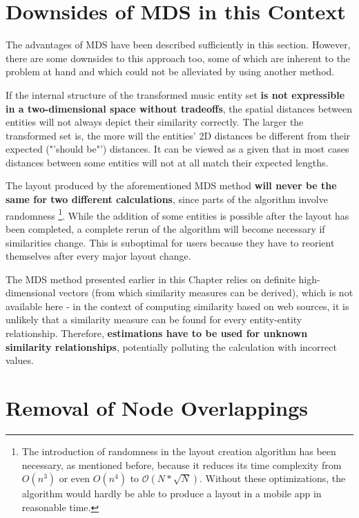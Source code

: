 \section{Downsides of MDS in this Context}

The advantages of MDS have been described sufficiently in this section. However, there are some downsides to this approach too, some of which are inherent to the problem at hand and which could not be alleviated by using another method.

If the internal structure of the transformed music entity set \textbf{is not expressible in a two-dimensional space without tradeoffs}, the spatial distances between entities will not always depict their similarity correctly. The larger the transformed set is, the more will the entities' 2D distances be different from their expected ("'should be"') distances. It can be viewed as a given that in most cases distances between some entities will not at all match their expected lengths.

The layout produced by the aforementioned MDS method \textbf{will never be the same for two different calculations}, since parts of the algorithm involve randomness 
\footnote{The introduction of randomness in the layout creation algorithm has been necessary, as mentioned before, because it reduces its time complexity from $O(n^3)$ or even $O(n^4)$ to $\mathcal O(N*\sqrt{N})$. Without these optimizations, the algorithm would hardly be able to produce a layout in a mobile app in reasonable time.}.
While the addition of some entities is possible after the layout has been completed, a complete rerun of the algorithm will become necessary if similarities change. This is suboptimal for users because they have to reorient themselves after every major layout change.

The MDS method presented earlier in this Chapter relies on definite high-dimensional vectors (from which similarity measures can be derived), which is not available here - in the context of computing similarity based on web sources, it is unlikely that a similarity measure can be found for every entity-entity relationship. Therefore, \textbf{estimations have to be used for unknown similarity relationships}, potentially polluting the calculation with incorrect values.

\section{Removal of Node Overlappings}
\label{sec:removal-node-overlapping}

